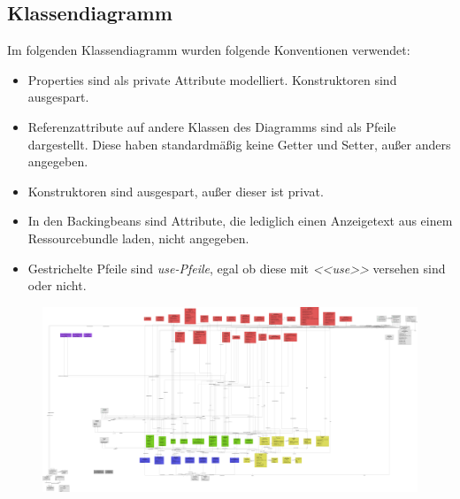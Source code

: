 
\newcommand{\classtable}[1]{\begin{longtable}[H]{m{5cm}m{9cm}}
                                \hline
                                \textbf{Klassenname} & \textbf{Beschreibung} \\
                                \hline
                                \hline
                                #1
\end{longtable}
}

\newcommand{\classentry}[2]{\textbf{#1} & #2 \\
	\hline
}

\subsection{Klassendiagramm}

Im folgenden Klassendiagramm wurden folgende Konventionen verwendet:
\begin{itemize}
    \item Properties sind als private Attribute modelliert.
    Konstruktoren sind ausgespart.
    \item Referenzattribute auf andere Klassen des Diagramms sind als Pfeile dargestellt.
    Diese haben standardmäßig keine Getter und Setter, außer anders angegeben.
    \item Konstruktoren sind ausgespart, außer dieser ist privat.
    \item In den Backingbeans sind Attribute, die lediglich einen Anzeigetext aus einem Ressourcebundle laden, nicht angegeben.
    \item Gestrichelte Pfeile sind \emph{use-Pfeile}, egal ob diese mit \emph{<<use>>} versehen sind oder nicht.
\end{itemize}

\begin{figure}[H]
	\centering
	\includegraphics[width=\linewidth]{graphics/klassendiagramm_png}
\end{figure}


